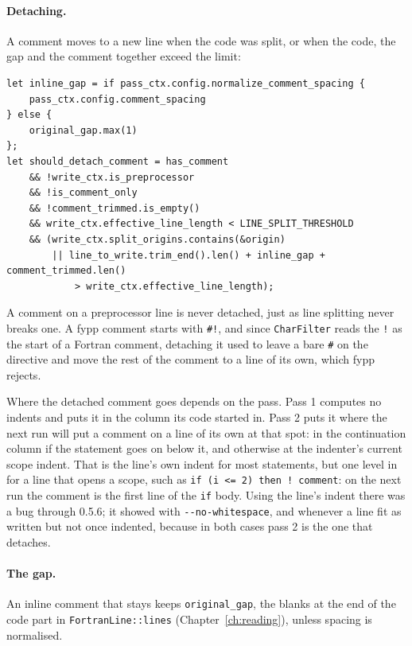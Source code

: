 \documentclass[11pt,a4paper,openany]{book}
\newcommand{\code}[1]{\texttt{\small #1}}
\newcommand{\flag}[1]{\texttt{\small -{}-#1}}
\begin{document}
\paragraph{Detaching.} A comment moves to a new line when the code was split, or
when the code, the gap and the comment together exceed the limit:

\begin{lstlisting}[style=rust]
let inline_gap = if pass_ctx.config.normalize_comment_spacing {
    pass_ctx.config.comment_spacing
} else {
    original_gap.max(1)
};
let should_detach_comment = has_comment
    && !write_ctx.is_preprocessor
    && !is_comment_only
    && !comment_trimmed.is_empty()
    && write_ctx.effective_line_length < LINE_SPLIT_THRESHOLD
    && (write_ctx.split_origins.contains(&origin)
        || line_to_write.trim_end().len() + inline_gap + comment_trimmed.len()
            > write_ctx.effective_line_length);
\end{lstlisting}

A comment on a preprocessor line is never detached, just as line splitting
never breaks one. A fypp comment starts with \code{\#!}, and since
\code{CharFilter} reads the \code{!} as the start of a Fortran comment,
detaching it used to leave a bare \code{\#} on the directive and move the rest
of the comment to a line of its own, which fypp rejects.

Where the detached comment goes depends on the pass. Pass 1 computes no
indents and puts it in the column its code started in. Pass 2 puts it where
the next run will put a comment on a line of its own at that spot: in the
continuation column if the statement goes on below it, and otherwise at the
indenter's current scope indent. That is the line's own indent for most
statements, but one level in for a line that opens a scope, such as
\code{if (i <= 2) then ! comment}: on the next run the comment is the first
line of the \code{if} body. Using the line's indent there was a bug through
0.5.6; it showed with \flag{no-whitespace}, and whenever a line fit as
written but not once indented, because in both cases pass 2 is the one that
detaches.

\paragraph{The gap.} An inline comment that stays keeps \code{original\_gap},
the blanks at the end of the code part in \code{FortranLine::lines}
(Chapter~\ref{ch:reading}), unless spacing is normalised.
\end{document}
